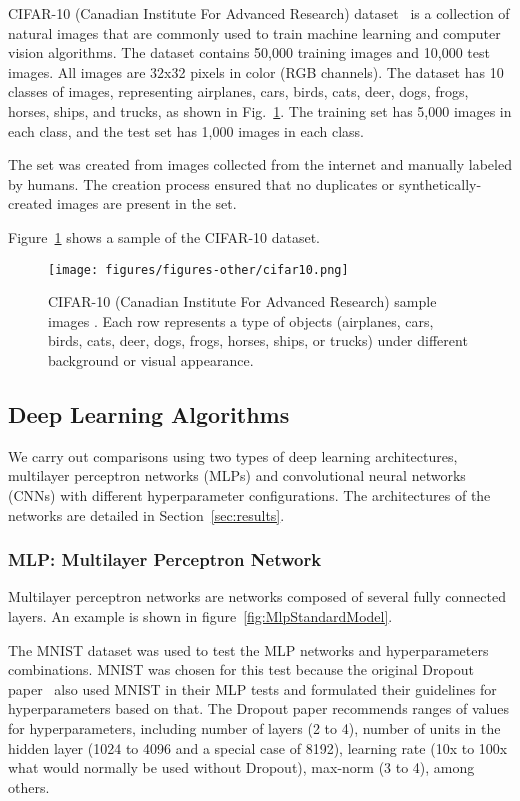 \documentclass[../dropout-vs-batch-normalization.tex]{subfiles}
\begin{document}
CIFAR-10 (Canadian Institute For Advanced Research) dataset~\cite{Krizhevsky2009} is a collection of natural images that are commonly used to train machine learning and computer vision algorithms. The dataset contains 50,000 training images and 10,000 test images. All images are 32x32 pixels in color (RGB channels). The dataset has 10 classes of images, representing airplanes, cars, birds, cats, deer, dogs, frogs, horses, ships, and trucks, as shown in Fig.~\ref{fig:CifarSample}. The training set has 5,000 images in each class, and the test set has 1,000 images in each class.

The set was created from images collected from the internet and manually labeled by humans. The creation process ensured that no duplicates or synthetically-created images are present in the set.

Figure~\ref{fig:CifarSample} shows a sample of the CIFAR-10 dataset.

\begin{figure}[!htbp]
\centerline{\texttt{[image: figures/figures-other/cifar10.png]}}
\caption{CIFAR-10 (Canadian Institute For Advanced Research) sample images \cite{KrizhevskyCifar}. Each row represents a type of objects (airplanes, cars, birds, cats, deer, dogs, frogs, horses, ships, or trucks) under different background or visual appearance.}
\label{fig:CifarSample}
\end{figure}

\subsection{Deep Learning Algorithms}

We carry out comparisons using two types of deep learning architectures, multilayer perceptron networks (MLPs) and convolutional neural networks (CNNs) with different hyperparameter configurations. The architectures of the networks are detailed in Section~\ref{sec:results}.

\medskip
\subsubsection{MLP: Multilayer Perceptron Network}

Multilayer perceptron networks are networks composed of several fully connected layers. An example is shown in figure~\ref{fig:MlpStandardModel}.

The MNIST dataset was used to test the MLP networks and hyperparameters combinations. MNIST was chosen for this test because the original Dropout paper~\cite{Srivastava2014} also used MNIST in their MLP tests and formulated their guidelines for hyperparameters based on that. The Dropout paper recommends ranges of values for hyperparameters, including number of layers (2 to 4), number of units in the hidden layer (1024 to 4096 and a special case of 8192), learning rate (10x to 100x what would normally be used without Dropout), max-norm (3 to 4), among others.
\end{document}
